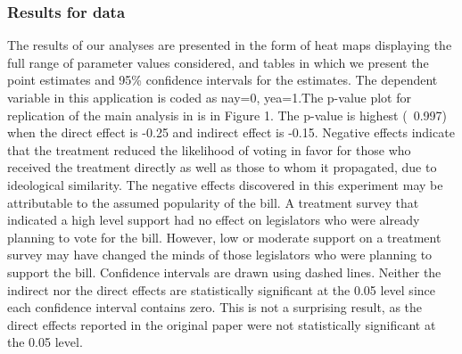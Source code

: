 \documentclass[12pt]{article}
\begin{document}
\subsubsection{Results for \citet{butler2011can} data}

The results of our analyses are presented in the form of heat maps displaying the full range of parameter values considered, and tables in which we present the point estimates and 95\% confidence intervals for the estimates. The dependent variable in this application is coded as nay=0, yea=1.The p-value plot for replication of the main analysis in \citet{coppock2014information} is in Figure 1. The p-value is highest (~0.997) when the direct effect is -0.25 and indirect effect is -0.15. Negative effects indicate that the treatment reduced the likelihood of voting in favor for those who received the treatment directly as well as those to whom it propagated, due to ideological similarity. The negative effects discovered in this experiment may be attributable to the assumed popularity of the bill. A treatment survey that indicated a high level support had no effect on legislators who were already planning to vote for the bill. However, low or moderate support on a treatment survey may have changed the minds of those legislators who were planning to support the bill. Confidence intervals are drawn using dashed lines. Neither the indirect nor the direct effects are statistically significant at the 0.05 level since each confidence interval contains zero. This is not a surprising result, as the direct effects reported in the original paper were not statistically significant at the 0.05 level.
\end{document}
